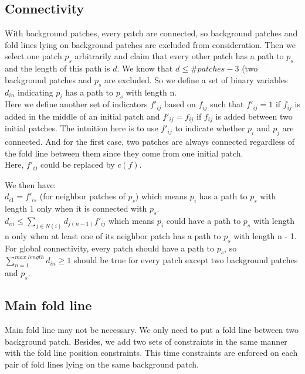\documentclass{article}
\begin{document}
\subsection{Connectivity}
With background patches, every patch are connected, so background patches and fold lines lying on background patches are excluded from consideration. Then we select one patch $p_s$ arbitrarily and claim that every other patch has a path to $p_s$ and the length of this path is $d$. We know that $d \leq \# patches - 3$ (two background patches and $p_s$ are excluded. So we define a set of binary variables $d_{in}$ indicating $p_i$ has a path to $p_s$ with length n.\\
\color{red}
Here we define another set of indicators $f'_{ij}$ based on $f_{ij}$ such that $f'_{ij} = 1$ if $f_{ij}$ is added in the middle of an initial patch and $f'_{ij} = f_{ij}$ if $f_{ij}$ is added between two initial patches. The intuition here is to use $f'_{ij}$ to indicate whether $p_i$ and $p_j$ are connected. And for the first case, two patches are always connected regardless of the fold line between them since they come from one initial patch.\\
\color{blue}
Here, $f'_{ij}$ could be replaced by $c(f)$.
\color{black}

We then have:\\
$d_{i1} = f'_{is}$ (for neighbor patches of $p_s$) which means $p_i$ has a path to $p_s$ with length 1 only when it is connected with $p_s$.\\
$d_{in} \leq \sum_{j \in N(i)}{d_{j(n-1)}f'_{ij}}$ which means $p_i$ could have a path to $p_s$ with length n only when at least one of its neighbor patch has a path to $p_s$ with length n - 1.\\
For global connectivity, every patch should have a path to $p_s$, so $\sum_{n=1}^{max\_length}{d_{in} \geq 1}$ should be true for every patch except two background patches and $p_s$.

\subsection{Main fold line}
Main fold line may not be necessary. We only need to put a fold line between two background patch. Besides, we add two sets of constraints in the same manner with the fold line position constraints. This time constraints are enforced on each pair of fold lines lying on the same background patch.
\end{document}
